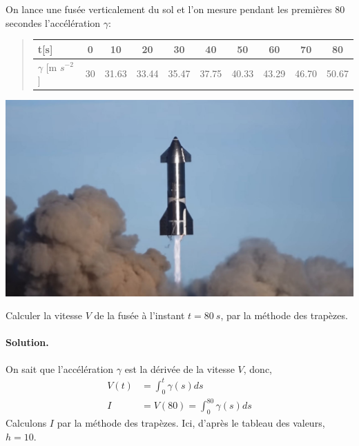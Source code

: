 \documentclass[%
oneside,                 %
final,                   %
10pt,french]{article}
\newenvironment{doconceexercise}{}{}
\newcounter{doconceexercisecounter}
\begin{document}
\begin{doconceexercise}



On lance une fusée verticalement du sol et l’on mesure pendant les premières 80 secondes l'accélération $\gamma$:


\begin{quote}
\begin{tabular}{lccccccccc}
\hline
\multicolumn{1}{l}{ t[s] } & \multicolumn{1}{c}{ 0 } & \multicolumn{1}{c}{ 10 } & \multicolumn{1}{c}{ 20 } & \multicolumn{1}{c}{ 30 } & \multicolumn{1}{c}{ 40 } & \multicolumn{1}{c}{ 50 } & \multicolumn{1}{c}{ 60 } & \multicolumn{1}{c}{ 70 } & \multicolumn{1}{c}{ 80 } \\
\hline
$\gamma$ [m $s^{-2}$] & 30 & 31.63 & 33.44 & 35.47 & 37.75 & 40.33 & 43.29 & 46.70 & 50.67 \\
\hline
\end{tabular}
\end{quote}

\noindent


\vspace{6mm}

\centerline{\includegraphics[width=0.7\linewidth]{imgs/SpaceX-Starship.jpg}}

\vspace{6mm}




Calculer la vitesse $V$ de la fusée à l’instant $t=80 \ s$, par la méthode des trapèzes.


\paragraph{Solution.}
On sait que l’accélération $\gamma$ est la dérivée de la vitesse $V$, donc,
\begin{align*}
V(t) &= \int_0^t \gamma(s) ds \\
I &= V(80) = \int_0^{80} \gamma(s) ds
\end{align*}
Calculons $I$ par la méthode des trapèzes. Ici, d’après le tableau des valeurs, $h = 10$.


\end{doconceexercise}
\end{document}

